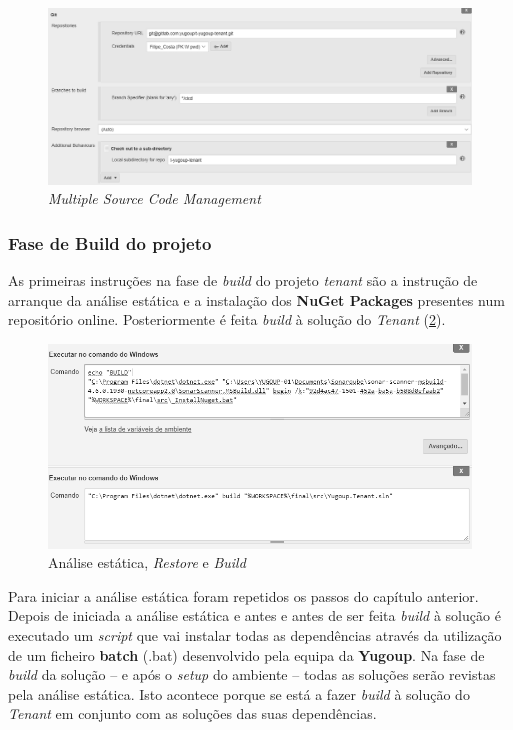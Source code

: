 \begin{figure}[hbt!]
\centering
\includegraphics[width=0.9\linewidth]{Cap6/JenkinsMultipleSCM.png}
\caption{\textit{Multiple Source Code Management}}
\label{Fig:Fig64}
\end{figure}

\subsubsection{Fase de \textbf{Build} do projeto}

\hspace{1cm}As primeiras instruções na fase de \textit{build} do projeto \textit{tenant} são a instrução de arranque da análise estática e a instalação dos \textbf{NuGet Packages} presentes num repositório online. Posteriormente é feita \textit{build} à solução do \textit{Tenant} (\ref{Fig:Fig65}).

\begin{figure}[hbt!]
\centering
\includegraphics[width=0.9\linewidth]{Cap6/JenkinsTenantBuild.png}
\caption{Análise estática, \textit{Restore} e \textit{Build} }
\label{Fig:Fig65}
\end{figure}

\hspace{1cm}Para iniciar a análise estática foram repetidos os passos do capítulo anterior. Depois de iniciada a análise estática e antes e antes de ser feita \textit{build} à solução é executado um \textit{script} que vai instalar todas as dependências através da utilização de um ficheiro \textbf{batch} (.bat) desenvolvido pela equipa da \textbf{Yugoup}. Na fase de \textit{build} da solução -- e após o \textit{setup} do ambiente -- todas as soluções serão revistas pela análise estática. Isto acontece porque se está a fazer \textit{build} à solução do \textit{Tenant} em conjunto com as soluções das suas dependências.

